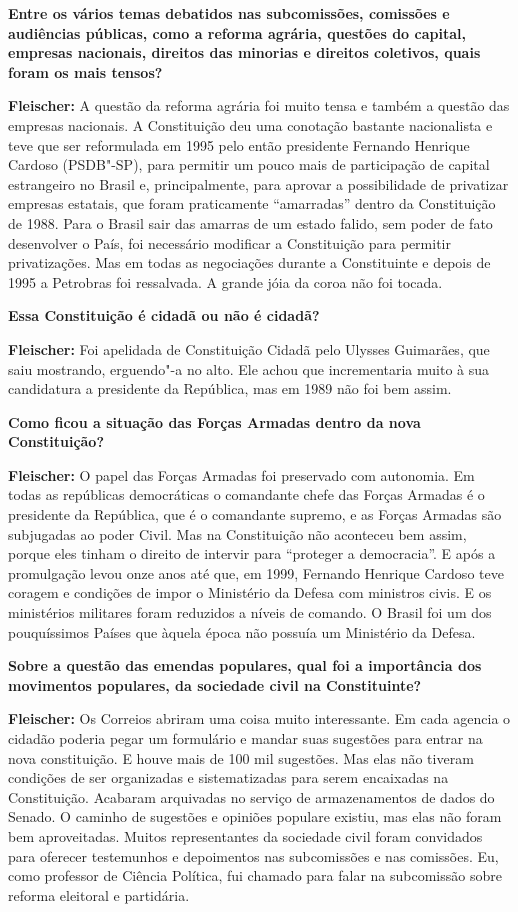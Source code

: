 \textbf{Entre os vários temas debatidos nas subcomissões, comissões e
audiências públicas, como a reforma agrária, questões do capital,
empresas nacionais, direitos das minorias e direitos coletivos, quais
foram os mais tensos?}

\textbf{Fleischer:} A questão da reforma agrária foi muito tensa e
também a questão das empresas nacionais. A Constituição deu uma
conotação bastante nacionalista e teve que ser reformulada em 1995 pelo
então presidente Fernando Henrique Cardoso (PSDB"-SP), para permitir um
pouco mais de participação de capital estrangeiro no Brasil e,
principalmente, para aprovar a possibilidade de privatizar empresas
estatais, que foram praticamente ``amarradas'' dentro da Constituição de
1988. Para o Brasil sair das amarras de um estado falido, sem poder de
fato desenvolver o País, foi necessário modificar a Constituição para
permitir privatizações. Mas em todas as negociações durante a
Constituinte e depois de 1995 a Petrobras foi ressalvada. A grande jóia
da coroa não foi tocada.

\textbf{Essa Constituição é cidadã ou não é cidadã?}

\textbf{Fleischer:} Foi apelidada de Constituição Cidadã pelo Ulysses
Guimarães, que saiu mostrando, erguendo"-a no alto. Ele achou que
incrementaria muito à sua candidatura a presidente da República, mas em
1989 não foi bem assim.

\textbf{Como ficou a situação das Forças Armadas dentro da nova
Constituição?}

\textbf{Fleischer:} O papel das Forças Armadas foi preservado com
autonomia. Em todas as repúblicas democráticas o comandante chefe das
Forças Armadas é o presidente da República, que é o comandante supremo,
e as Forças Armadas são subjugadas ao poder Civil. Mas na Constituição
não aconteceu bem assim, porque eles tinham o direito de intervir para
``proteger a democracia''. E após a promulgação levou onze anos até que,
em 1999, Fernando Henrique Cardoso teve coragem e condições de impor o
Ministério da Defesa com ministros civis. E os ministérios militares
foram reduzidos a níveis de comando. O Brasil foi um dos pouquíssimos
Países que àquela época não possuía um Ministério da Defesa.

\textbf{Sobre a questão das emendas populares, qual foi a importância
dos movimentos populares, da sociedade civil na Constituinte?}

\textbf{Fleischer:} Os Correios abriram uma coisa muito interessante. Em
cada agencia o cidadão poderia pegar um formulário e mandar suas
sugestões para entrar na nova constituição. E houve mais de 100 mil
sugestões. Mas elas não tiveram condições de ser organizadas e
sistematizadas para serem encaixadas na Constituição. Acabaram
arquivadas no serviço de armazenamentos de dados do Senado. O caminho de
sugestões e opiniões populare existiu, mas elas não foram bem
aproveitadas. Muitos representantes da sociedade civil foram convidados
para oferecer testemunhos e depoimentos nas subcomissões e nas
comissões. Eu, como professor de Ciência Política, fui chamado para
falar na subcomissão sobre reforma eleitoral e partidária.

